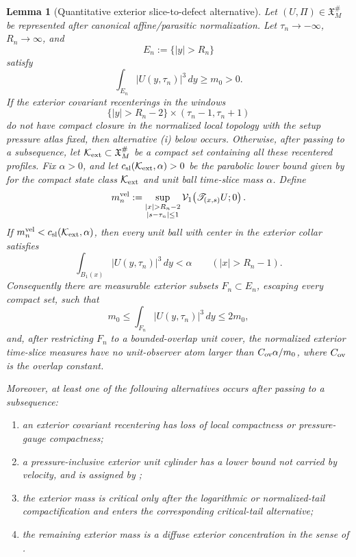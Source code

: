 \documentclass[11pt]{amsart}
\numberwithin{equation}{section}
\theoremstyle{plain}
\newtheorem{lemma}[lemma]{Lemma}
\theoremstyle{definition}
\theoremstyle{remark}
\newcommand{\Vel}{\mathcal V}
\newcommand{\calK}{\mathcal K}
\begin{document}
\begin{lemma}[Quantitative exterior slice-to-defect alternative]
\label{lem:exterior-slice-to-diffuse-defect}
Let \((U,\Pi)\in\mathfrak X_M^\#\) be represented after canonical
affine/parasitic normalization.  Let \(\tau_n\to-\infty\), \(R_n\to\infty\), and
\[
   E_n:=\{|y|>R_n\}
\]
satisfy
\[
   \int_{E_n}|U(y,\tau_n)|^3\,dy\ge m_0>0 .
\]
If the exterior covariant recenterings in the windows
\[
   \{|y|>R_n-2\}\times(\tau_n-1,\tau_n+1)
\]
do not have compact closure in the normalized local topology with the setup
pressure atlas fixed, then alternative \textup{(i)} below occurs.  Otherwise,
after passing to a subsequence, let \(\calK_{\rm ext}\subset\mathfrak X_M^\#\)
be a compact set containing all these recentered profiles.  Fix \(\alpha>0\),
and let \(c_{\rm sl}(\calK_{\rm ext},\alpha)>0\) be the parabolic lower bound
given by  for the compact state class
\(\calK_{\rm ext}\) and unit ball time-slice mass \(\alpha\).  Define
\[
   m_n^{\rm vel}
   :=
   \sup_{\substack{|x|>R_n-2\\ |s-\tau_n|\le1}}
   \Vel_1\!\left(\mathscr T_{(x,s)}U;0\right).
\]
If \(m_n^{\rm vel}<c_{\rm sl}(\calK_{\rm ext},\alpha)\), then every unit ball
with center in the exterior collar satisfies
\[
   \int_{B_1(x)}|U(y,\tau_n)|^3\,dy<\alpha
   \qquad (|x|>R_n-1).
\]
Consequently there are measurable exterior subsets \(F_n\subset E_n\), escaping
every compact set, such that
\[
   m_0\le\int_{F_n}|U(y,\tau_n)|^3\,dy\le2m_0,
\]
and, after restricting \(F_n\) to a bounded-overlap unit cover, the normalized
exterior time-slice measures have no unit-observer atom larger than
\(C_{\rm ov}\alpha/m_0\), where \(C_{\rm ov}\) is the overlap constant.

Moreover, at least one of the following alternatives occurs after passing to a
subsequence:
\begin{enumerate}[label=\textup{(\roman*)}]
   \item an exterior covariant recentering has loss of local compactness or
   pressure-gauge compactness;
   \item a pressure-inclusive exterior unit cylinder has a lower bound not
   carried by velocity, and is assigned by
   ;
   \item the exterior mass is critical only after the logarithmic or
   normalized-tail compactification and enters the corresponding critical-tail
   alternative;
   \item the remaining exterior mass is a diffuse exterior concentration in the
   sense of .
\end{enumerate}
\end{lemma}
\end{document}
